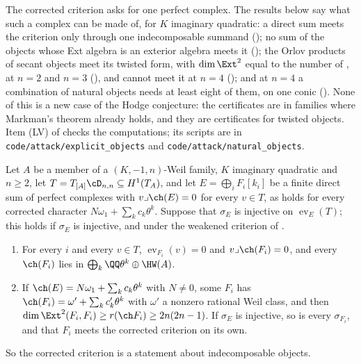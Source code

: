 The corrected criterion asks for one perfect complex. The results below say
what such a complex can be made of, for $K$ imaginary quadratic: a direct sum
meets the criterion only through one indecomposable summand
(); no sum of the objects whose Ext algebra is an
exterior algebra meets it (); the Orlov products of
secant objects meet its twisted form, with $\dim\Ext^{2}$ equal to the number
of , at $n=2$ and $n=3$ (), and
cannot meet it at $n=4$ (); and at $n=4$ a combination of
natural objects needs at least eight of them, on one conic
(). None of this is a new case of the Hodge
conjecture: the certificates are in families where Markman's theorem already
holds, and they are certificates for twisted objects. Item (LV) of
 checks the computations; its scripts are in
\texttt{code/\allowbreak attack/\allowbreak explicit\_\allowbreak objects} and
\texttt{code/\allowbreak attack/\allowbreak natural\_\allowbreak objects}.

\begin{lemma}
\label{lem:p2primesummands}
Let $A$ be a member of a $(K,-1,n)$-Weil family, $K$ imaginary quadratic and
$n\ge2$, let $T=T_{[A]}\cD_{n,n}\subseteq H^{1}(T_{A})$, and let
$E=\bigoplus_{i}F_{i}[k_{i}]$ be a finite direct sum of perfect complexes with
$v\lrcorner\ch(E)=0$ for every $v\in T$, as holds for every corrected character
$N\omega_{1}+\sum_{k}c_{k}\theta^{k}$. Suppose that $\sigma_{E}$ is injective on
$\operatorname{ev}_{E}(T)$; this holds if $\sigma_{E}$ is injective, and under
the weakened criterion of \cite[Question 11.4]{Mar25b}.
\begin{enumerate}[label=\textup{(\roman*)},leftmargin=2.6em,itemsep=2pt]
\item For every $i$ and every $v\in T$, $\operatorname{ev}_{F_{i}}(v)=0$ and
  $v\lrcorner\ch(F_{i})=0$, and every $\ch(F_{i})$ lies in
  $\bigoplus_{k}\QQ\theta^{k}\oplus\HW(A)$.
\item If $\ch(E)=N\omega_{1}+\sum_{k}c_{k}\theta^{k}$ with $N\ne0$, some
  $F_{i}$ has $\ch(F_{i})=\omega'+\sum_{k}c'_{k}\theta^{k}$ with $\omega'$ a
  nonzero rational Weil class, and then
  $\dim\Ext^{2}(F_{i},F_{i})\ge r(\ch F_{i})\ge2n(2n-1)$. If $\sigma_{E}$ is
  injective, so is every $\sigma_{F_{i}}$, and that $F_{i}$ meets the corrected
  criterion on its own.
\end{enumerate}
So the corrected criterion is a statement about indecomposable objects.
\end{lemma}

